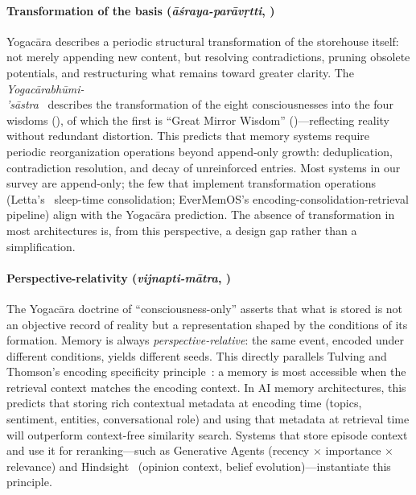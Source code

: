 \paragraph{Transformation of the basis (\emph{\=a\'sraya-par\=av\d{r}tti},
)}
Yogac\=ara describes a periodic structural transformation of the
storehouse itself: not merely appending new content, but resolving
contradictions, pruning obsolete potentials, and restructuring what
remains toward greater clarity.  The
\emph{Yogac\=arabh\=umi-\\'s\=astra}~\cite{yogacarabhumi} describes
the transformation of the eight consciousnesses into the four wisdoms
(), of which the first is ``Great Mirror Wisdom''
()---reflecting reality without redundant distortion.
This predicts that memory systems require periodic reorganization
operations beyond append-only growth: deduplication, contradiction
resolution, and decay of unreinforced entries.  Most systems in our
survey are append-only; the few that implement transformation operations
(Letta's~\cite{packer2023memgpt} sleep-time
consolidation; EverMemOS's encoding-consolidation-retrieval pipeline)
align with the Yogac\=ara prediction.  The absence of
transformation in most architectures is, from this perspective, a
design gap rather than a simplification.

\paragraph{Perspective-relativity (\emph{vijnapti-m\=atra}, )}
The Yogac\=ara doctrine of ``consciousness-only'' asserts that what is
stored is not an objective record of reality but a representation shaped
by the conditions of its formation.  Memory is always
\emph{perspective-relative}: the same event, encoded under different
conditions, yields different seeds.  This directly parallels Tulving and
Thomson's encoding specificity principle~\cite{tulving1973}: a memory is
most accessible when the retrieval context matches the encoding context.
In AI memory architectures, this predicts that storing rich contextual
metadata at encoding time (topics, sentiment, entities, conversational
role) and using that metadata at retrieval time will outperform
context-free similarity search.  Systems that store episode context and
use it for reranking---such as Generative Agents (recency $\times$
importance $\times$ relevance) and Hindsight~\cite{latimer2025hindsight}
(opinion context, belief evolution)---instantiate this principle.

